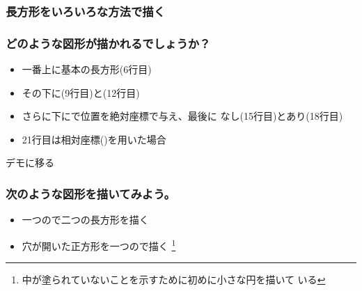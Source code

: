 \fi
\begin{frame}[containsverbatim]
 \frametitle{長方形をいろいろな方法で描く}
\end{frame}
\begin{frame}[containsverbatim]
 \frametitle{どのような図形が描かれるでしょうか？}
 \begin{itemize}
  \item 一番上に基本の長方形(6行目)
  \item その下に(9行目)と(12行目)
  \item さらに下にで位置を絶対座標で与え、最後に
        なし(15行目)とあり(18行目)
  \item 21行目は相対座標()を用いた場合
 \end{itemize}
 デモに移る
\end{frame}
\begin{frame}[containsverbatim]
 \frametitle{次のような図形を描いてみよう。}
\begin{itemize}
 \item 一つので二つの長方形を描く
 \item 穴が開いた正方形を一つので描く
      \footnote{中が塗られていないことを示すために初めに小さな円を描いて
       いる}

\end{itemize} 
\end{frame}
\iftrue
